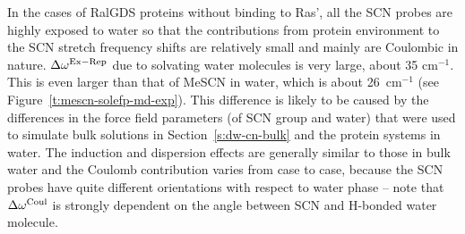 \documentclass[a4paper,titlepage,twoside,fleqn,12pt]{book}
\begin{document}
\begin{refsection}
In the cases of RalGDS proteins without binding to Ras',
all the SCN probes are highly exposed to water so
that the contributions from protein environment to the SCN
stretch frequency shifts are relatively small and mainly are
Coulombic in nature. $\Delta\omega^{\rm Ex-Rep}$ due to solvating water molecules
is very large, about 35 cm$^{-1}$. This is even larger than that of
MeSCN in water, which is about 26~cm$^{-1}$ (see Figure~\ref{t:mescn-solefp-md-exp}).
This difference is likely to be caused by the differences in
the force field parameters (of SCN group and water) that were
used to simulate bulk solutions in Section~\ref{s:dw-cn-bulk} and the protein
systems in water. The induction and dispersion effects are
generally similar to those in bulk water and the Coulomb
contribution varies from case to case, because the SCN probes
have quite different orientations with respect to water phase --
note that $\Delta\omega^{\rm Coul}$ is strongly dependent on the angle between
SCN and H-bonded water molecule.


\end{refsection}
\end{document}
